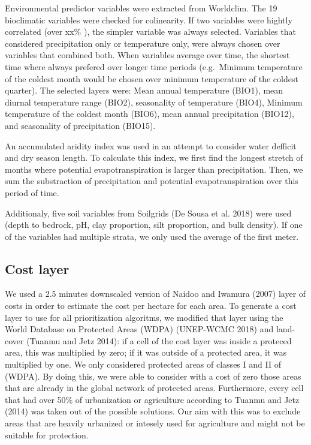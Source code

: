 \documentclass[]{article}
\begin{document}
Environmental predictor variables were extracted from Worldclim. The 19 bioclimatic variables were checked for colinearity. If two variables were hightly correlated (over xx\% ), the simpler variable was always selected. Variables that considered precipitation only or temperature only, were always chosen over variables that combined both. When variables average over time, the shortest time where always prefered over longer time periods (e.g.~Minimum temperature of the coldest month would be chosen over minimum temperature of the coldest quarter). The selected layers were: Mean annual temperature (BIO1), mean diurnal temperature range (BIO2), seasonality of temperature (BIO4), Minimum temperature of the coldest month (BIO6), mean annual precipitation (BIO12), and seasonality of precipitation (BIO15).

An accumulated aridity index was used in an attempt to consider water defficit and dry season length. To calculate this index, we first find the longest stretch of months where potential evapotranspiration is larger than precipitation. Then, we sum the substraction of precipitation and potential evapotranspiration over this period of time.

Additionaly, five soil variables from Soilgrids (De Sousa et al. 2018) were used (depth to bedrock, pH, clay proportion, silt proportion, and bulk density). If one of the variables had multiple strata, we only used the average of the first meter.

\hypertarget{cost-layer}{%
\subsection{Cost layer}\label{cost-layer}}

We used a 2.5 minutes downscaled version of Naidoo and Iwamura (2007) layer of costs in order to estimate the cost per hectare for each area. To generate a cost layer to use for all prioritization algoritms, we modified that layer using the World Database on Protected Areas (WDPA) (UNEP-WCMC 2018) and land-cover (Tuanmu and Jetz 2014): if a cell of the cost layer was inside a proteced area, this was multiplied by zero; if it was outside of a protected area, it was multiplied by one. We only considered protected areas of classes I and II of (WDPA). By doing this, we were able to consider with a cost of zero those areas that are already in the global network of protected areas. Furthermore, every cell that had over 50\% of urbanization or agriculture according to Tuanmu and Jetz (2014) was taken out of the possible solutions. Our aim with this was to exclude areas that are heavily urbanized or intesely used for agriculture and might not be suitable for protection.
\end{document}
